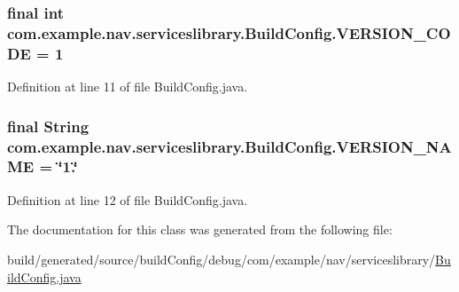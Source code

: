 \subsubsection[{\texorpdfstring{V\+E\+R\+S\+I\+O\+N\+\_\+\+C\+O\+DE}{VERSION_CODE}}]{\setlength{\rightskip}{0pt plus 5cm}final int com.\+example.\+nav.\+serviceslibrary.\+Build\+Config.\+V\+E\+R\+S\+I\+O\+N\+\_\+\+C\+O\+DE = 1\hspace{0.3cm}{\ttfamily [static]}}\hypertarget{classcom_1_1example_1_1nav_1_1serviceslibrary_1_1_build_config_a081c43fbe8fc5d043ae4dc49a934e399}{}\label{classcom_1_1example_1_1nav_1_1serviceslibrary_1_1_build_config_a081c43fbe8fc5d043ae4dc49a934e399}


Definition at line 11 of file Build\+Config.\+java.

\subsubsection[{\texorpdfstring{V\+E\+R\+S\+I\+O\+N\+\_\+\+N\+A\+ME}{VERSION_NAME}}]{\setlength{\rightskip}{0pt plus 5cm}final String com.\+example.\+nav.\+serviceslibrary.\+Build\+Config.\+V\+E\+R\+S\+I\+O\+N\+\_\+\+N\+A\+ME = \char`\"{}1.\char`\"{}\hspace{0.3cm}{\ttfamily [static]}}\hypertarget{classcom_1_1example_1_1nav_1_1serviceslibrary_1_1_build_config_a2824c70d0c2d0027a9d5fdb1cfb5be01}{}\label{classcom_1_1example_1_1nav_1_1serviceslibrary_1_1_build_config_a2824c70d0c2d0027a9d5fdb1cfb5be01}


Definition at line 12 of file Build\+Config.\+java.



The documentation for this class was generated from the following file\+:\begin{DoxyCompactItemize}
\item 
build/generated/source/build\+Config/debug/com/example/nav/serviceslibrary/\hyperlink{debug_2com_2example_2nav_2serviceslibrary_2_build_config_8java}{Build\+Config.\+java}\end{DoxyCompactItemize}
